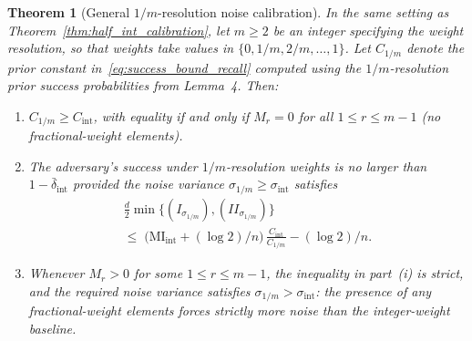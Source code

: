 \documentclass[letterpaper]{article} %
\newtheorem{theorem}{Theorem}
\newcommand{\MI}{\mathrm{MI}}
\begin{document}
\begin{theorem}[General $1/m$-resolution noise calibration]
\label{thm:general_m_calibration}
In the same setting as Theorem~\ref{thm:half_int_calibration}, let $m \ge 2$ be an integer specifying the weight resolution, so that weights take values in $\{0, 1/m, 2/m, \dots, 1\}$. Let $C_{1/m}$ denote the prior constant in~\eqref{eq:success_bound_recall} computed using the $1/m$-resolution prior success probabilities from Lemma~4. Then:
\begin{enumerate}[label=(\roman*)]
    \item $C_{1/m} \ge C_{\mathrm{int}}$, with equality if and only if $M_r = 0$ for all $1 \le r \le m-1$ (no fractional-weight elements).

    \item The adversary's success under $1/m$-resolution weights is no larger than $1 - \bar{\delta}_{\mathrm{int}}$ provided the noise variance $\sigma_{1/m} \ge \sigma_{\mathrm{int}}$ satisfies
    \begin{multline}
    \label{eq:m_calibration}
    \frac{d}{2}\min\{(I_{\sigma_{1/m}}),(II_{\sigma_{1/m}})\}
    \\
    \le\;
    \bigl(\MI_{\mathrm{int}} + (\log 2)/n\bigr)\,\frac{C_{\mathrm{int}}}{C_{1/m}}
    - (\log 2)/n.
    \end{multline}

    \item Whenever $M_r > 0$ for some $1 \le r \le m-1$, the inequality in part~(i) is strict, and the required noise variance satisfies $\sigma_{1/m} > \sigma_{\mathrm{int}}$: the presence of any fractional-weight elements forces strictly more noise than the integer-weight baseline.
\end{enumerate}
\end{theorem}
\end{document}
